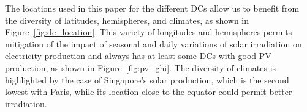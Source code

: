 The locations used in this paper for the different DCs allow us to benefit from the diversity of latitudes, hemispheres, and climates, as shown in Figure~\ref{fig:dc_location}. This variety of longitudes and hemispheres permits mitigation of the impact of seasonal and daily variations of solar irradiation on electricity production and always has at least some DCs with good PV production, as shown in Figure~\ref{fig:pv_ghi}. The diversity of climates is highlighted by the case of Singapore's solar production, which is the second lowest with Paris, while its location close to the equator could permit better irradiation.



